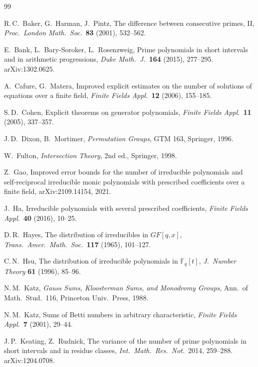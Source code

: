 \documentclass[11pt,a4paper]{article}
\theoremstyle{definition}
\theoremstyle{remark}
\begin{document}
\begin{thebibliography}{99}

R.\,C.~Baker, G.~Harman, J.~Pintz,
The difference between consecutive primes, II,
\textit{Proc.\ London Math.\ Soc.}\ \textbf{83} (2001), 532--562.

E.~Bank, L.~Bary-Soroker, L.~Rosenzweig,
Prime polynomials in short intervals and in arithmetic progressions,
\textit{Duke Math.\ J.}\ \textbf{164} (2015), 277--295. arXiv:1302.0625.

A.~Cafure, G.~Matera,
Improved explicit estimates on the number of solutions of equations over a finite field,
\textit{Finite Fields Appl.}\ \textbf{12} (2006), 155--185.

S.\,D.~Cohen,
Explicit theorems on generator polynomials,
\textit{Finite Fields Appl.}\ \textbf{11} (2005), 337--357.

J.\,D.~Dixon, B.~Mortimer,
\textit{Permutation Groups}, GTM 163, Springer, 1996.

W.~Fulton, \textit{Intersection Theory}, 2nd ed., Springer, 1998.

Z.~Gao,
Improved error bounds for the number of irreducible polynomials and self-reciprocal irreducible
monic polynomials with prescribed coefficients over a finite field, arXiv:2109.14154, 2021.

J.~Ha,
Irreducible polynomials with several prescribed coefficients,
\textit{Finite Fields Appl.}\ \textbf{40} (2016), 10--25.

D.\,R.~Hayes,
The distribution of irreducibles in $GF[q,x]$,
\textit{Trans.\ Amer.\ Math.\ Soc.}\ \textbf{117} (1965), 101--127.

C.\,N.~Hsu,
The distribution of irreducible polynomials in $\mathbb F_q[t]$,
\textit{J.\ Number Theory} \textbf{61} (1996), 85--96.

N.\,M.~Katz,
\textit{Gauss Sums, Kloosterman Sums, and Monodromy Groups},
Ann.\ of Math.\ Stud.\ 116, Princeton Univ.\ Press, 1988.

N.\,M.~Katz,
Sums of Betti numbers in arbitrary characteristic,
\textit{Finite Fields Appl.}\ \textbf{7} (2001), 29--44.

J.\,P.~Keating, Z.~Rudnick,
The variance of the number of prime polynomials in short intervals and in residue classes,
\textit{Int.\ Math.\ Res.\ Not.}\ 2014, 259--288. arXiv:1204.0708.


\end{thebibliography}
\end{document}
